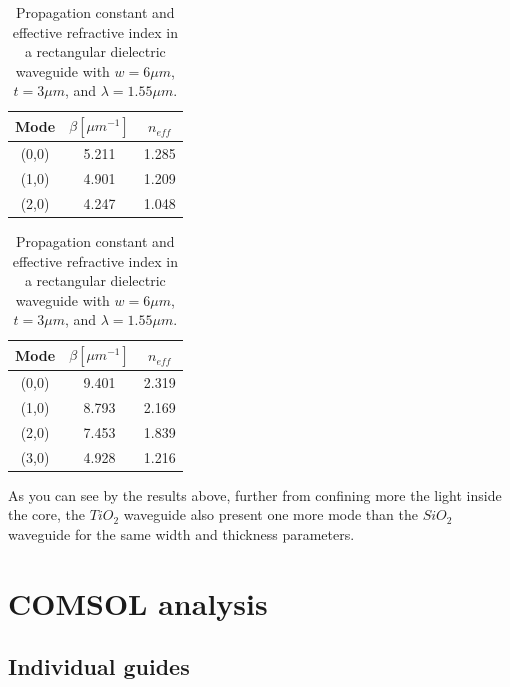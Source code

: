 \documentclass[a4paper,12pt]{article}
\begin{document}
\begin{table}[H]
    \centering
    \begin{subtable}{0.45\textwidth}
        \centering
        \begin{tabular}{ccc}
            \toprule
            Mode & $\beta [\mu m^{-1}]$ & $n_{eff}$ \\
            \midrule
            (0,0) & 5.211 & 1.285 \\
            (1,0) & 4.901 & 1.209 \\
            (2,0) & 4.247 & 1.048 \\
            \bottomrule
        \end{tabular}
        \caption{$SiO_2$.}
    \end{subtable}
    \hfill
    \begin{subtable}{0.45\textwidth}
        \centering
        \begin{tabular}{ccc}
            \toprule
            Mode & $\beta [\mu m^{-1}]$ & $n_{eff}$ \\
            \midrule
            (0,0) & 9.401 & 2.319 \\
            (1,0) & 8.793 & 2.169 \\
            (2,0) & 7.453 & 1.839 \\
            (3,0) & 4.928 & 1.216 \\
            \bottomrule
        \end{tabular}
        \caption{$TiO_2$.}
        \label{tab:modes_d5um}
    \end{subtable}
    \caption{Propagation constant and effective refractive index in a rectangular dielectric waveguide with $w = 6 \mu m$, $t = 3\mu m$, and $\lambda = 1.55 \mu m$.}
\end{table}

As you can see by the results above, further from confining more the light inside the core, the $TiO_2$ waveguide also present one more mode than the $SiO_2$ waveguide for the same width and thickness parameters.

\section{COMSOL analysis}
\label{sec:comsol}

\subsection{Individual guides}
\label{subsec:individual_guides}
\end{document}

